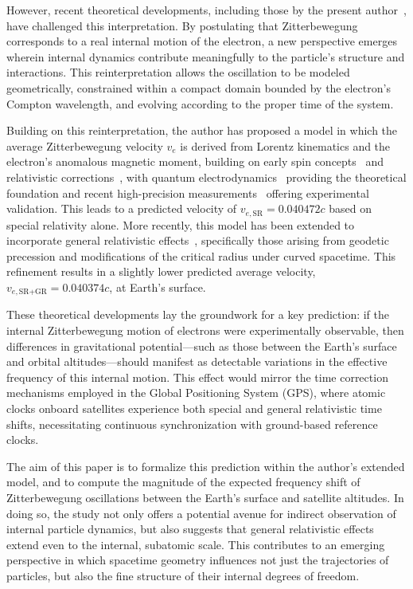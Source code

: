 \documentclass[%
 reprint,
 amsmath,amssymb,
 aps,
]{revtex4-1}
\numberwithin{equation}{section}%
\begin{document}
However, recent theoretical developments, including those by the present author~\cite{hanamura1811.0312,hanamura2006.0104}, have challenged this interpretation. By postulating that Zitterbewegung corresponds to a real internal motion of the electron, a new perspective emerges wherein internal dynamics contribute meaningfully to the particle's structure and interactions. This reinterpretation allows the oscillation to be modeled geometrically, constrained within a compact domain bounded by the electron's Compton wavelength, and evolving according to the proper time of the system.

Building on this reinterpretation, the author has proposed a model in which the average Zitterbewegung velocity $v_e$ is derived from Lorentz kinematics and the electron's anomalous magnetic moment, building on early spin concepts~\cite{uhlenbeck1925} and relativistic corrections~\cite{thomas1926}, with quantum electrodynamics~\cite{schwinger1948} providing the theoretical foundation and recent high-precision measurements~\cite{fan2023} offering experimental validation. This leads to a predicted velocity of $v_{e,\text{SR}} = 0.040472c$ based on special relativity alone. More recently, this model has been extended to incorporate general relativistic effects~\cite{einstein1916}, specifically those arising from geodetic precession and modifications of the critical radius under curved spacetime. This refinement results in a slightly lower predicted average velocity, $v_{e,\text{SR+GR}} = 0.040374c$, at Earth's surface.

These theoretical developments lay the groundwork for a key prediction: if the internal Zitterbewegung motion of electrons were experimentally observable, then differences in gravitational potential—such as those between the Earth's surface and orbital altitudes—should manifest as detectable variations in the effective frequency of this internal motion. This effect would mirror the time correction mechanisms employed in the Global Positioning System (GPS), where atomic clocks onboard satellites experience both special and general relativistic time shifts, necessitating continuous synchronization with ground-based reference clocks.

The aim of this paper is to formalize this prediction within the author's extended model, and to compute the magnitude of the expected frequency shift of Zitterbewegung oscillations between the Earth's surface and satellite altitudes. In doing so, the study not only offers a potential avenue for indirect observation of internal particle dynamics, but also suggests that general relativistic effects extend even to the internal, subatomic scale. This contributes to an emerging perspective in which spacetime geometry influences not just the trajectories of particles, but also the fine structure of their internal degrees of freedom.
\end{document}

